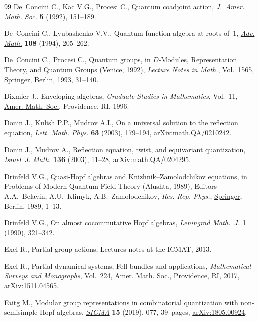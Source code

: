 \documentclass[pdftex]{sigma}%
\numberwithin{equation}{section}
\numberwithin{figure}{section}
\begin{document}
\begin{thebibliography}{99}
De~Concini C., Kac V.G., Procesi C., Quantum coadjoint action, \href{https://doi.org/10.2307/2152754}{\textit{J.~Amer.
 Math. Soc.}} \textbf{5} (1992), 151--189.

De~Concini C., Lyubashenko V.V., Quantum function algebra at roots of~{$1$},
 \href{https://doi.org/10.1006/aima.1994.1071}{\textit{Adv. Math.}} \textbf{108} (1994), 205--262.

De~Concini C., Procesi C., Quantum groups, in {$D$}-Modules, Representation
 Theory, and Quantum Groups ({V}enice, 1992), \textit{Lecture Notes in Math.},
 Vol.~1565, \href{https://doi.org/10.1007/BFb0073466}{Springer}, Berlin, 1993, 31--140.

Dixmier J., Enveloping algebras, \textit{Graduate Studies in Mathematics},
 Vol.~11, \href{https://doi.org/10.1090/gsm/011}{Amer. Math. Soc.}, Providence, RI, 1996.

Donin J., Kulish P.P., Mudrov A.I., On a universal solution to the reflection
 equation, \href{https://doi.org/10.1023/A:1024438101617}{\textit{Lett. Math. Phys.}} \textbf{63} (2003), 179--194,
 \href{https://arxiv.org/abs/math.QA/0210242}{arXiv:math.QA/0210242}.

Donin J., Mudrov A., Reflection equation, twist, and equivariant quantization,
 \href{https://doi.org/10.1007/BF02807191}{\textit{Israel~J. Math.}} \textbf{136} (2003), 11--28,
 \href{https://arxiv.org/abs/math.QA/0204295}{arXiv:math.QA/0204295}.

Drinfeld V.G., Quasi-{H}opf algebras and {K}nizhnik--{Z}amolodchikov equations,
 in Problems of Modern Quantum Field Theory ({A}lushta, 1989), Editors A.A.~Belavin, A.U.~Klimyk, A.B.~Zamolodchikov, \textit{Res. Rep. Phys.}, \href{https://doi.org/10.1007/978-3-642-84000-5_1}{Springer}, Berlin,
 1989, 1--13.

Drinfeld V.G., On almost cocommutative {H}opf algebras, \textit{Leningrad
 Math.~J.} \textbf{1} (1990), 321--342.

Exel R., Partial group actions, {L}ectures notes at the ICMAT, 2013.

Exel R., Partial dynamical systems, {F}ell bundles and applications,
 \textit{Mathematical Surveys and Monographs}, Vol.~224, \href{https://doi.org/10.1090/surv/224}{Amer. Math. Soc.},
 Providence, RI, 2017, \href{https://arxiv.org/abs/1511.04565}{arXiv:1511.04565}.

Faitg M., Modular group representations in combinatorial quantization with
 non-semisimple {H}opf algebras, \href{https://doi.org/10.3842/SIGMA.2019.077}{\textit{SIGMA}} \textbf{15} (2019), 077,
 39~pages, \href{https://arxiv.org/abs/1805.00924}{arXiv:1805.00924}.


\end{thebibliography}
\end{document}
